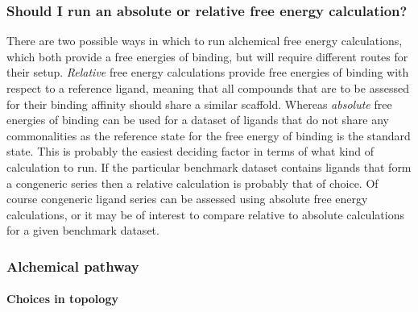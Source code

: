 \documentclass[9pt,bestpractices]{livecoms}
\begin{document}
\subsubsection{Should I run an absolute or relative free energy calculation?}
There are two possible ways in which to run alchemical free energy calculations, which both provide a free energies of binding, but will require different routes for their setup. \textit{Relative} free energy calculations provide free energies of binding with respect to a reference ligand, meaning that all compounds that are to be assessed for their binding affinity should share a similar scaffold. Whereas \textit{absolute} free energies of binding can be used for a dataset of ligands that do not share any commonalities as the reference state for the free energy of binding is the standard state. This is probably the easiest deciding factor in terms of what kind of calculation to run. If the particular benchmark dataset contains ligands that form a congeneric series then a relative calculation is probably that of choice. Of course congeneric ligand series can be assessed using absolute free energy calculations, or it may be of interest to compare relative to absolute calculations for a given benchmark dataset. 


\subsubsection{Alchemical pathway}

\paragraph{Choices in topology}
\end{document}
